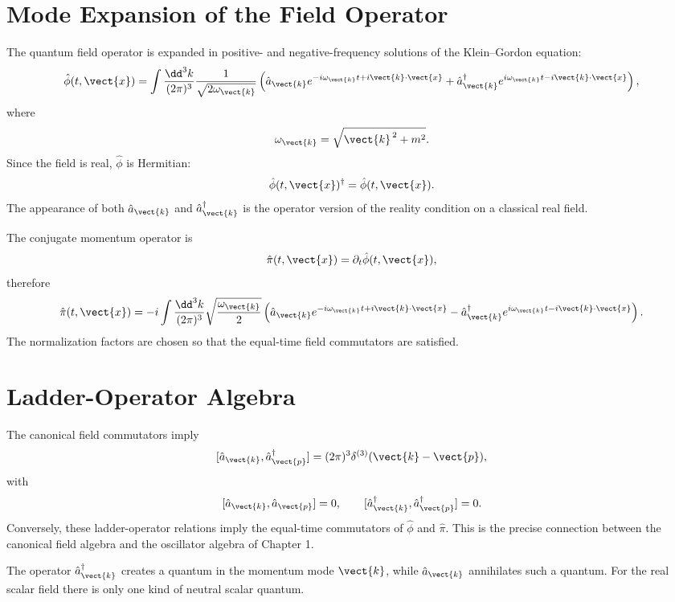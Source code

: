 \section{Mode Expansion of the Field Operator}

The quantum field operator is expanded in positive- and negative-frequency
solutions of the Klein--Gordon equation:
\[
    \hat\phi(t,\vect{x})
    = \int \frac{\dd^3k}{(2\pi)^3}
      \frac{1}{\sqrt{2\omega_{\vect{k}}}}
      \left(
          \hat a_{\vect{k}}
          e^{-i\omega_{\vect{k}}t+i\vect{k}\cdot\vect{x}}
          +
          \hat a_{\vect{k}}^\dagger
          e^{i\omega_{\vect{k}}t-i\vect{k}\cdot\vect{x}}
      \right),
\]
where
\[
    \omega_{\vect{k}}=\sqrt{\vect{k}^{\,2}+m^2}.
\]
Since the field is real, \(\hat\phi\) is Hermitian:
\[
    \hat\phi(t,\vect{x})^\dagger=\hat\phi(t,\vect{x}).
\]
The appearance of both \(\hat a_{\vect{k}}\) and
\(\hat a_{\vect{k}}^\dagger\) is the operator version of the reality condition
on a classical real field.

The conjugate momentum operator is
\[
    \hat\pi(t,\vect{x})
    = \partial_t\hat\phi(t,\vect{x}),
\]
therefore
\[
    \hat\pi(t,\vect{x})
    = -i\int \frac{\dd^3k}{(2\pi)^3}
      \sqrt{\frac{\omega_{\vect{k}}}{2}}
      \left(
          \hat a_{\vect{k}}
          e^{-i\omega_{\vect{k}}t+i\vect{k}\cdot\vect{x}}
          -
          \hat a_{\vect{k}}^\dagger
          e^{i\omega_{\vect{k}}t-i\vect{k}\cdot\vect{x}}
      \right).
\]
The normalization factors are chosen so that the equal-time field commutators
are satisfied.

\section{Ladder-Operator Algebra}

The canonical field commutators imply
\[
    [\hat a_{\vect{k}},\hat a_{\vect{p}}^\dagger]
    = (2\pi)^3\delta^{(3)}(\vect{k}-\vect{p}),
\]
with
\[
    [\hat a_{\vect{k}},\hat a_{\vect{p}}]=0,
    \qquad
    [\hat a_{\vect{k}}^\dagger,\hat a_{\vect{p}}^\dagger]=0.
\]
Conversely, these ladder-operator relations imply the equal-time commutators of
\(\hat\phi\) and \(\hat\pi\). This is the precise connection between the
canonical field algebra and the oscillator algebra of Chapter 1.

The operator \(\hat a_{\vect{k}}^\dagger\) creates a quantum in the momentum
mode \(\vect{k}\), while \(\hat a_{\vect{k}}\) annihilates such a quantum. For
the real scalar field there is only one kind of neutral scalar quantum.

